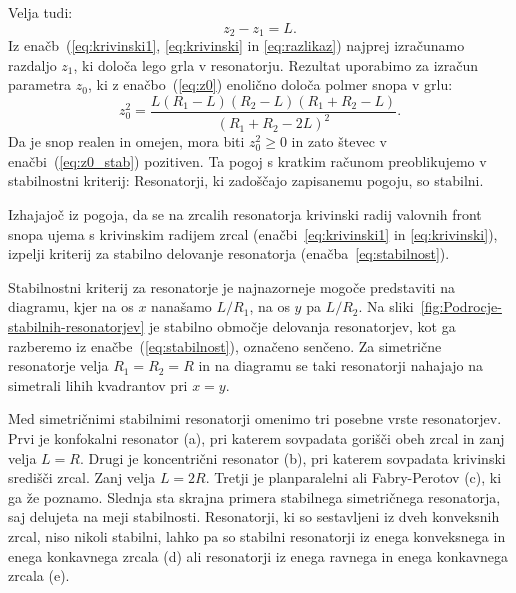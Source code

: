 Velja tudi:
\begin{equation}
z_{2}-z_{1}=L.
\label{eq:razlikaz}
\end{equation}
Iz  enačb~(\ref{eq:krivinski1}, \ref{eq:krivinski} in \ref{eq:razlikaz}) 
najprej izračunamo razdaljo $z_{1}$, ki določa
lego grla v resonatorju. Rezultat uporabimo za izračun parametra $z_{0}$, ki z 
enačbo~(\ref{eq:z0}) enolično določa polmer snopa v grlu:
\begin{equation}
z_{0}^{2}=\frac{L(R_{1}-L)(R_{2}-L)(R_{1}+R_{2}-L)}{(R_{1}+R_{2}-2L)^{2}}.
\label{eq:z0_stab}
\end{equation}
Da je snop realen in omejen, mora biti $z_{0}^{2}\geq 0$ in zato števec
v enačbi~(\ref{eq:z0_stab}) pozitiven. Ta pogoj s kratkim računom preoblikujemo
v stabilnostni kriterij:
Resonatorji, ki zadoščajo zapisanemu pogoju, so stabilni. 

\begin{naloga}
Izhajajoč iz pogoja, da se na zrcalih resonatorja krivinski radij valovnih front snopa ujema s krivinskim
radijem zrcal (enačbi~\ref{eq:krivinski1} in \ref{eq:krivinski}), izpelji 
kriterij za stabilno delovanje resonatorja 
(enačba~\ref{eq:stabilnost}).
\end{naloga}

Stabilnostni kriterij za resonatorje je najnazorneje mogoče predstaviti na diagramu, 
kjer na os $x$ nanašamo $L/R_{1}$, na os $y$ pa $L/R_{2}$. Na 
sliki~\ref{fig:Podrocje-stabilnih-resonatorjev} je stabilno območje delovanja 
resonatorjev, kot ga razberemo iz enačbe~(\ref{eq:stabilnost}), označeno senčeno.
Za simetrične resonatorje 
velja $R_{1}=R_{2}=R$ in na diagramu se taki resonatorji nahajajo na simetrali 
lihih kvadrantov pri $x=y$. 

Med simetričnimi stabilnimi resonatorji omenimo tri posebne vrste resonatorjev.
Prvi je konfokalni resonator (a), 
pri katerem sovpadata gorišči obeh zrcal in zanj velja $L=R$. Drugi je 
koncentrični resonator (b), 
pri katerem sovpadata krivinski središči zrcal. Zanj velja $L=2R$.
Tretji je planparalelni ali Fabry-Perotov (c), ki ga že poznamo. 
Slednja sta skrajna primera stabilnega simetričnega resonatorja, saj delujeta na meji
stabilnosti. 
Resonatorji, ki so sestavljeni iz dveh konveksnih zrcal, niso nikoli stabilni, lahko
pa so stabilni resonatorji iz enega konveksnega in enega konkavnega zrcala (d)
ali resonatorji iz enega ravnega in enega konkavnega zrcala (e). 

